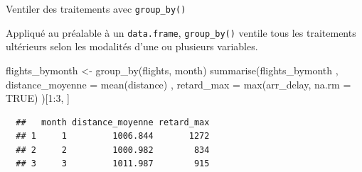 \documentclass[12pt,ignorenonframetext,handout,]{beamer}
\newenvironment{Shaded}{}{}
\newcommand{\DataTypeTok}[1]{#1}
\newcommand{\DecValTok}[1]{#1}
\newcommand{\KeywordTok}[1]{\textcolor[rgb]{0.00,0.00,1.00}{#1}}
\newcommand{\NormalTok}[1]{#1}
\newcommand{\OperatorTok}[1]{#1}
\newcommand{\OtherTok}[1]{\textcolor[rgb]{1.00,0.25,0.00}{#1}}
\newcommand{\StringTok}[1]{\textcolor[rgb]{0.00,0.50,0.50}{#1}}
\renewenvironment{Shaded}{\begin{snugshade}}{\end{snugshade}}
\begin{document}
\begin{frame}[fragile]{Ventiler des traitements avec
\texttt{group\_by()}}
\protect\hypertarget{ventiler-des-traitements-avec-group_by}{}

Appliqué au préalable à un \texttt{data.frame}, \texttt{group\_by()}
ventile tous les traitements ultérieurs selon les modalités d’une ou
plusieurs variables.

\begin{Shaded}
\begin{Highlighting}[]
\NormalTok{flights_bymonth <-}\StringTok{ }\KeywordTok{group_by}\NormalTok{(flights, month)}
\KeywordTok{summarise}\NormalTok{(flights_bymonth}
\NormalTok{  , }\DataTypeTok{distance_moyenne =} \KeywordTok{mean}\NormalTok{(distance)}
\NormalTok{  , }\DataTypeTok{retard_max =} \KeywordTok{max}\NormalTok{(arr_delay, }\DataTypeTok{na.rm =} \OtherTok{TRUE}\NormalTok{)}
\NormalTok{)[}\DecValTok{1}\OperatorTok{:}\DecValTok{3}\NormalTok{, ]}
\end{Highlighting}
\end{Shaded}

\begin{verbatim}
  ##   month distance_moyenne retard_max
  ## 1     1         1006.844       1272
  ## 2     2         1000.982        834
  ## 3     3         1011.987        915
\end{verbatim}

\end{frame}
\end{document}
